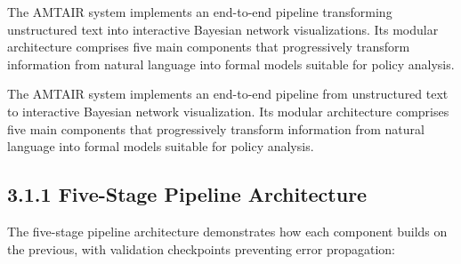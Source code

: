 \documentclass[
  11pt,
  letterpaper,
]{book}
\begin{document}

The AMTAIR system implements an end-to-end pipeline transforming
unstructured text into interactive Bayesian network visualizations. Its
modular architecture comprises five main components that progressively
transform information from natural language into formal models suitable
for policy analysis.

The AMTAIR system implements an end-to-end pipeline from unstructured
text to interactive Bayesian network visualization. Its modular
architecture comprises five main components that progressively transform
information from natural language into formal models suitable for policy
analysis.

\subsection*{3.1.1 Five-Stage Pipeline
Architecture}\label{sec-five-stage-pipeline}

The five-stage pipeline architecture demonstrates how each component
builds on the previous, with validation checkpoints preventing error
propagation:
\end{document}
